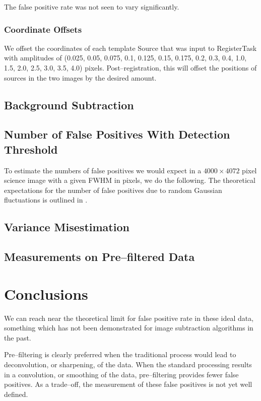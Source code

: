 \documentclass[prd, nofootinbib, floatfix, 11pt,tightenlines,times]{article}
\begin{document}
The false positive rate was not seen to vary significantly.

\subsubsection{Coordinate Offsets}

We offset the coordinates of each template Source that was input to
RegisterTask with amplitudes of (0.025, 0.05, 0.075, 0.1, 0.125, 0.15,
0.175, 0.2, 0.3, 0.4, 1.0, 1.5, 2.0, 2.5, 3.0, 3.5, 4.0) pixels.
Post--registration, this will offset the positions of sources in the
two images by the desired amount.

\subsection{Background Subtraction}

\subsection{Number of False Positives With Detection Threshold}

To estimate the numbers of false positives we would expect in a
$4000\times4072$ pixel science image with a given FWHM in pixels, we
do the following.  The theoretical expectations for the number of
false positives due to random Gaussian fluctuations is outlined in
\cite{Kaiser-PointSources}.



\subsection{Variance Misestimation}

\subsection{Measurements on Pre--filtered Data}

\section{Conclusions}

We can reach near the theoretical limit for false positive rate in
these ideal data, something which has not been demonstrated for image
subtraction algorithms in the past.

Pre--filtering is clearly preferred when the traditional process would
lead to deconvolution, or sharpening, of the data.  When the standard
processing results in a convolution, or smoothing of the data,
pre--filtering provides fewer false positives.  As a trade--off, the
measurement of these false positives is not yet well defined.
\end{document}
